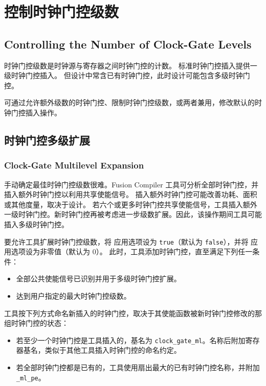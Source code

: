 \section{控制时钟门控级数}
\subsection*{Controlling the Number of Clock-Gate Levels}

时钟门控级数是时钟源与寄存器之间时钟门控的计数。
标准时钟门控插入提供一级时钟门控插入。
但设计中常含已有时钟门控，此时设计可能包含多级时钟门控。

可通过允许额外级数的时钟门控、限制时钟门控级数，或两者兼用，修改默认的时钟门控插入操作。

\subsection{时钟门控多级扩展}
\subsubsection*{Clock-Gate Multilevel Expansion}

手动确定最佳时钟门控级数很难。Fusion Compiler 工具可分析全部时钟门控，并插入额外时钟门控以利用共享使能信号。
插入额外时钟门控可能改善功耗、面积或其他度量，取决于设计。
若六个或更多时钟门控共享使能信号，工具插入额外一级时钟门控。新时钟门控再被考虑进一步级数扩展。因此，该操作期间工具可能插入多级时钟门控。

要允许工具扩展时钟门控级数，将  应用选项设为 \texttt{true}（默认为 \texttt{false}），并将  应用选项设为非零值（默认为 0）。
此时，工具添加时钟门控，直至满足下列任一条件：
\begin{itemize}
  \item 全部公共使能信号已识别并用于多级时钟门控扩展。
  \item 达到用户指定的最大时钟门控级数。
\end{itemize}

工具按下列方式命名新插入的时钟门控，取决于其使能函数被新时钟门控修改的那组时钟门控的状态：
\begin{itemize}
  \item 若至少一个时钟门控是工具插入的，基名为 \texttt{clock\_gate\_ml}。名称后附加寄存器基名，类似于其他工具插入时钟门控的命名约定。
  \item 若全部时钟门控都是已有的，工具使用扇出最大的已有时钟门控名称，并附加 \texttt{\_ml\_pe}。
\end{itemize}


